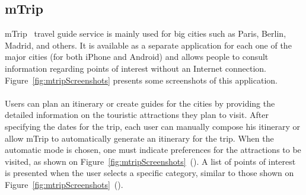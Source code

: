 \subsection{mTrip}
mTrip~\cite{mTrip} travel guide service is mainly used for big cities such as Paris, Berlin,  Madrid, and others. It is available as a separate application for each one of the major cities (for both iPhone and Android) and allows people to consult information regarding points of interest without an Internet connection. Figure~\ref{fig:mtripScreenshots} presents some screenshots of this application. \\
\\
Users can plan an itinerary or create guides for the cities by providing the detailed information on the touristic attractions they plan to visit. After specifying the dates for the trip, each user can manually compose his itinerary or allow mTrip to automatically generate an itinerary for the trip. When the automatic mode is chosen, one must indicate preferences for the attractions to be visited, as shown on Figure~\ref{fig:mtripScreenshots}~(). A list of points of interest is presented when the user selects a specific category, similar to those shown on Figure~\ref{fig:mtripScreenshots}~().
\\
